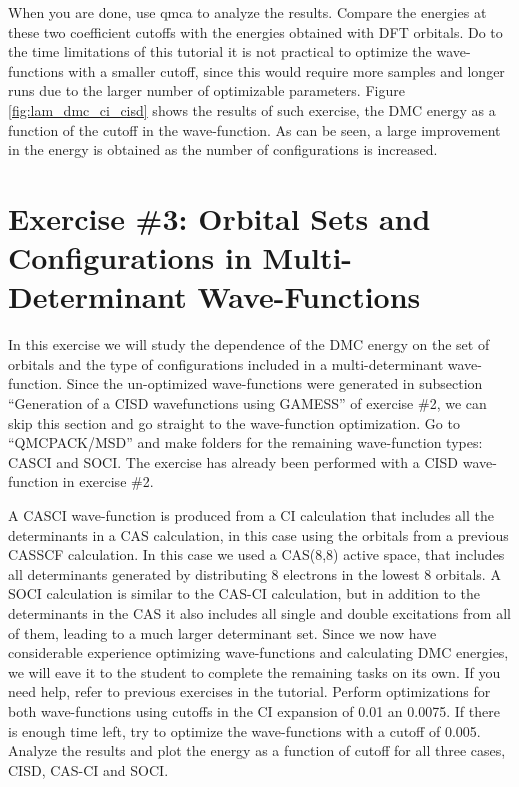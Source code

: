 When you are done, use qmca to analyze the results. Compare the energies at these two
coefficient cutoffs with the energies obtained with DFT orbitals. Do to the time limitations
of this tutorial it is not practical to optimize the wave-functions with a smaller cutoff, since
this would require more samples and longer runs due to the larger number of optimizable
parameters. Figure \ref{fig:lam_dmc_ci_cisd} shows the results of such exercise, the DMC energy as a function of the
cutoff in the wave-function. As can be seen, a large improvement in the energy is obtained
as the number of configurations is increased.


\section{Exercise \#3: Orbital Sets and Configurations in Multi-Determinant Wave-Functions}
In this exercise we will study the dependence of the DMC energy on the set of orbitals
and the type of configurations included in a multi-determinant wave-function. Since the
un-optimized wave-functions were generated in subsection “Generation of a CISD wavefunctions 
using GAMESS” of exercise \#2, we can skip this section and go straight to the
wave-function optimization. Go to “QMCPACK/MSD” and make folders for the remaining
wave-function types: CASCI and SOCI. The exercise has already been performed with a
CISD wave-function in exercise \#2.

A CASCI wave-function is produced from a CI calculation that includes all the determinants 
in a CAS calculation, in this case using the orbitals from a previous CASSCF
calculation. In this case we used a CAS(8,8) active space, that includes all determinants
generated by distributing 8 electrons in the lowest 8 orbitals. A SOCI calculation is similar
to the CAS-CI calculation, but in addition to the determinants in the CAS it also includes
all single and double excitations from all of them, leading to a much larger determinant
set. Since we now have considerable experience optimizing wave-functions and calculating
DMC energies, we will eave it to the student to complete the remaining tasks on its own.
If you need help, refer to previous exercises in the tutorial. Perform optimizations for both
wave-functions using cutoffs in the CI expansion of 0.01 an 0.0075. If there is enough time
left, try to optimize the wave-functions with a cutoff of 0.005. Analyze the results and plot
the energy as a function of cutoff for all three cases, CISD, CAS-CI and SOCI.

